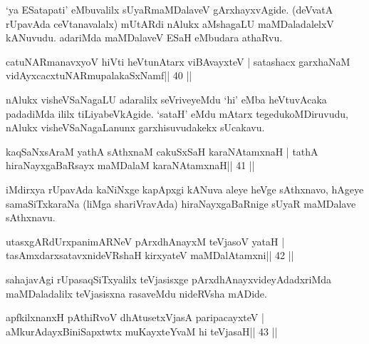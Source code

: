 \begin{artha}
`ya ESatapati' eMbuvalilx sUyaRmaMDalaveV gArxhayxvAgide. (deVvatA rUpavAda ceVtanavalalx) mUtARdi nAlukx aMshagaLU maMDaladalelxV kANuvudu. adariMda maMDalaveV ESaH eMbudara athaRvu.
\end{artha}



\begin{shl}
catuNARmanavxyoV hiVti heVtunA\s tarx viBAvayxteV |
satashacx garxhaNaM vidAyxcacxtuNARmupalakaSxNamf\hfill || 40 ||
\end{shl}

\begin{artha}
nAlukx visheVSaNagaLU adaralilx seVriveyeMdu `hi' eMba heVtuvAcaka padadiMda ililx tiLiyabeVkAgide. `sataH' eMdu mAtarx tegedukoMDiruvudu, nAlukx visheVSaNagaLanunx garxhisuvudakekx sUcakavu.
\end{artha}

\begin{shl}
kaqSaNxsAraM yathA sAthxnaM cakuSxSaH karaNAtamxnaH |
tathA hiraNayxgaBaRsayx maMDalaM karaNAtamxnaH\hfill || 41 ||
\end{shl}

\begin{artha}
iMdirxya rUpavAda kaNiNxge kapApxgi kANuva aleye heVge sAthxnavo, hAgeye samaSiTxkaraNa (liMga shariVravAda) hiraNayxgaBaRnige sUyaR maMDalave sAthxnavu.
\end{artha}



\begin{shl}
utasxgARdUrxpanimARNeV pArxdhAnayxM teVjasoV yataH |
tasAmxdarxsatavxnideVRshaH kirxyateV maMDalAtamxni\hfill || 42 ||
\end{shl}

\begin{artha}
sahajavAgi rUpasaqSiTxyalilx teVjasisxge pArxdhAnayxvideyAdadxriMda maMDaladalilx teVjasisxna rasaveMdu nideRVsha mADide.
\end{artha}



\begin{shl}
apfkilxnanxH pAthiRvoV dhAtusetxVjasA paripacayxteV |
aMkurAdayxBiniSapxtwtx muKayxteYvaM hi teVjasaH\hfill || 43 ||
\end{shl}

